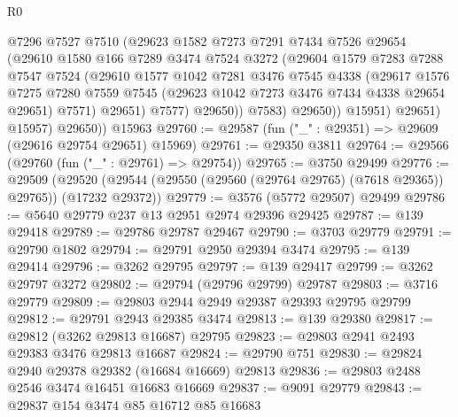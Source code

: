 \begin{lexlean}{R0}
\begin{coremodule}
                    @7296
                    @7527
                    @7510
                    (@29623
                      @1582
                      @7273
                      @7291
                      @7434
                      @7526
                      @29654
                      (@29610
                        @1580
                        @166
                        @7289
                        @3474
                        @7524
                        @3272
                        (@29604
                          @1579
                          @7283
                          @7288
                          @7547
                          @7524
                          (@29610
                            @1577
                            @1042
                            @7281
                            @3476
                            @7545
                            @4338
                            (@29617
                              @1576
                              @7275
                              @7280
                              @7559
                              @7545
                              (@29623 @1042 @7273 @3476 @7434 @4338 @29654 @29651)
                              @7571)
                            @29651)
                          @7577)
                        @29650))
                    @7583)
                  @29650))
              @15951)
            @29651)
          @15957)
        @29650))
    @15963
@29760 := @29587 (fun ("_" : @29351) => @29609 (@29616 @29754 @29651) @15969)
@29761 := @29350 @3811
@29764 := @29566 (@29760 (fun ("_" : @29761) => @29754))
@29765 := @3750 @29499
@29776 := @29509
    (@29520 (@29544 (@29550 (@29560 (@29764 @29765) (@7618 @29365)) @29765)) (@17232 @29372))
@29779 := @3576 (@5772 @29507) @29499
@29786 := @5640 @29779 @237 @13 @2951 @2974 @29396 @29425
@29787 := @139 @29418
@29789 := @29786 @29787 @29467
@29790 := @3703 @29779
@29791 := @29790 @1802
@29794 := @29791 @2950 @29394 @3474
@29795 := @139 @29414
@29796 := @3262 @29795
@29797 := @139 @29417
@29799 := @3262 @29797 @3272
@29802 := @29794 (@29796 @29799) @29787
@29803 := @3716 @29779
@29809 := @29803 @2944 @2949 @29387 @29393 @29795 @29799
@29812 := @29791 @2943 @29385 @3474
@29813 := @139 @29380
@29817 := @29812 (@3262 @29813 @16687) @29795
@29823 := @29803 @2941 @2493 @29383 @3476 @29813 @16687
@29824 := @29790 @751
@29830 := @29824 @2940 @29378 @29382 (@16684 @16669) @29813
@29836 := @29803 @2488 @2546 @3474 @16451 @16683 @16669
@29837 := @9091 @29779
@29843 := @29837 @154 @3474 @85 @16712 @85 @16683

\end{coremodule}
\end{lexlean}
